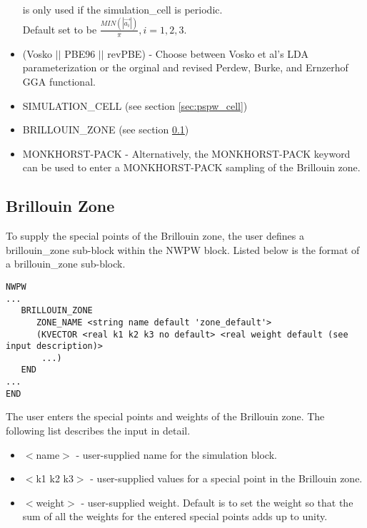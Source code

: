 \begin{itemize}
                          is only used if the simulation\_cell is periodic. \\
                           Default set to be
                          $\frac{MIN(\left| \vec{a_i} \right|)}{\pi}, i=1,2,3$.
        \item (Vosko $||$ PBE96 $||$ revPBE) - Choose between Vosko et al's LDA 
                               parameterization or the orginal and revised Perdew, Burke, 
                               and Ernzerhof GGA functional.
        \item SIMULATION\_CELL (see section \ref{sec:pspw_cell})
        \item BRILLOUIN\_ZONE  (see section \ref{sec:band_brillouin_zone})
        \item MONKHORST-PACK - Alternatively, the MONKHORST-PACK keyword can be used 
                               to enter a MONKHORST-PACK sampling of the Brillouin zone.

\end{itemize}


\subsection{Brillouin Zone}
\label{sec:band_brillouin_zone}
To supply the special points of the Brillouin zone,
the user defines a brillouin\_zone sub-block within the NWPW 
block.  Listed below is the format of a brillouin\_zone sub-block.
\begin{verbatim}
NWPW
...
   BRILLOUIN_ZONE
      ZONE_NAME <string name default 'zone_default'>
      (KVECTOR <real k1 k2 k3 no default> <real weight default (see input description)>
       ...)
   END
...
END
\end{verbatim}
The user enters the special points and weights of the
Brillouin zone.  The following list describes the input in detail.
\begin{itemize}
        \item $<$name$>$ - user-supplied name for the simulation block. 
        \item $<$k1 k2 k3$>$ - user-supplied values for a special point in the
                               Brillouin zone.
        \item $<$weight$>$ - user-supplied weight.  Default is to set the weight
                         so that the sum of all the weights for the entered  
                         special points adds up to unity.
\end{itemize}


